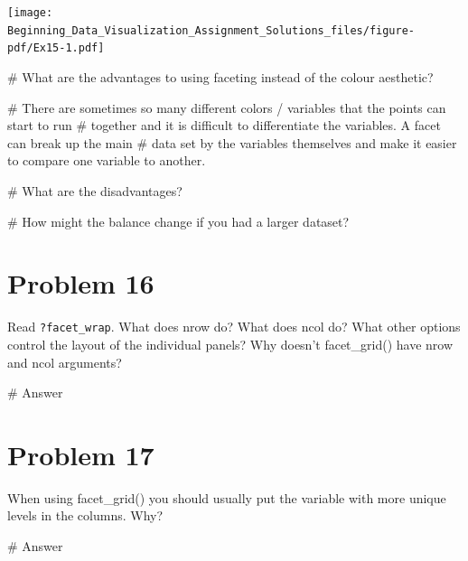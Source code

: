 \documentclass[
  letterpaper,
  DIV=11,
  numbers=noendperiod]{scrreprt}
\newenvironment{Shaded}{\begin{snugshade}}{\end{snugshade}}
\newcommand{\CommentTok}[1]{\textcolor[rgb]{0.37,0.37,0.37}{#1}}
\begin{document}
\texttt{[image: Beginning\_Data\_Visualization\_Assignment\_Solutions\_files/figure-pdf/Ex15-1.pdf]}

\begin{Shaded}
\begin{Highlighting}[]
\CommentTok{\# What are the advantages to using faceting instead of the colour aesthetic? }

\CommentTok{\# There are sometimes so many different colors / variables that the points can start to run}
\CommentTok{\# together and it is difficult to differentiate the variables. A facet can break up the main}
\CommentTok{\# data set by the variables themselves and make it easier to compare one variable to another.}

\CommentTok{\# What are the disadvantages? }


\CommentTok{\# How might the balance change if you had a larger dataset?}
\end{Highlighting}
\end{Shaded}

\section*{Problem 16}\label{problem-16-3}


Read \texttt{?facet\_wrap}. What does nrow do? What does ncol do? What
other options control the layout of the individual panels? Why doesn't
facet\_grid() have nrow and ncol arguments?

\begin{Shaded}
\begin{Highlighting}[]
\CommentTok{\# Answer}
\end{Highlighting}
\end{Shaded}

\section*{Problem 17}\label{problem-17-3}


When using facet\_grid() you should usually put the variable with more
unique levels in the columns. Why?

\begin{Shaded}
\begin{Highlighting}[]
\CommentTok{\# Answer}
\end{Highlighting}
\end{Shaded}
\end{document}
